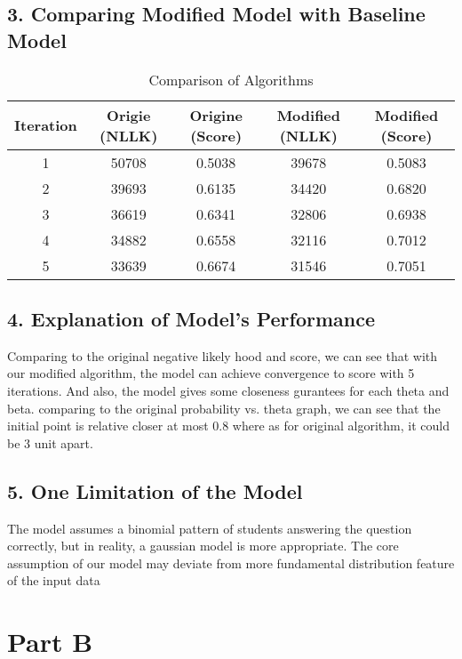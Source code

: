 \documentclass[12pt]{article}
\begin{document}
\subsection*{3. Comparing Modified Model with Baseline Model}
\begin{table}[htbp]
    \centering
    \caption{Comparison of Algorithms}
    \begin{tabular}{@{}ccccc@{}}
        \toprule
        \textbf{Iteration} & \textbf{Origie (NLLK)} & \textbf{Origine (Score)} & \textbf{Modified (NLLK)} & \textbf{Modified (Score)} \\ \midrule
        1 & 50708 & 0.5038 & 39678 & 0.5083 \\
        2 & 39693 & 0.6135 & 34420 & 0.6820 \\
        3 & 36619 & 0.6341 & 32806 & 0.6938 \\
        4 & 34882 & 0.6558 & 32116 & 0.7012 \\
        5 & 33639 & 0.6674 & 31546 & 0.7051 \\ \bottomrule
    \end{tabular}
\end{table}
\subsection*{4. Explanation of Model's Performance}
Comparing to the original negative likely hood and score, we can see that with our modified algorithm, the model can achieve convergence to score with 5 iterations. And also, the model gives some closeness gurantees for each theta and beta. comparing to the original probability vs. theta graph, we can see that the initial point is relative closer at most 0.8 where as for original algorithm, it could be 3 unit apart.
\subsection*{5. One Limitation of the Model}
The model assumes a binomial pattern of students answering the question correctly, but in reality, a gaussian model is more appropriate. The core assumption of our model may deviate from more fundamental distribution feature of the input data

\newpage
\section*{Part B}
\end{document}
